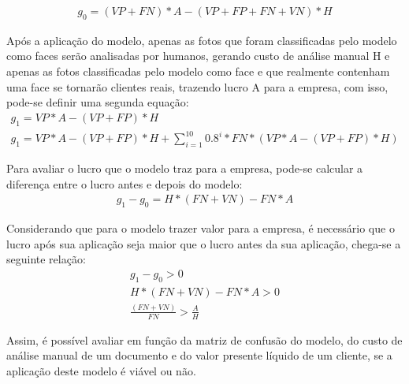 \begin{align} \label{eq:g_0}
    g_0 = (VP+FN)*A - (VP+FP+FN+VN)*H
\end{align}

Após a aplicação do modelo, apenas as fotos que foram classificadas pelo modelo como faces serão analisadas por humanos, gerando custo de análise manual H e apenas as fotos classificadas pelo modelo como face e que realmente contenham uma face se tornarão clientes reais, trazendo lucro A para a empresa, com isso, pode-se definir uma segunda equação:
\begin{align} \label{eq:g_1}
    g_1 = VP*A - (VP+FP)*H \\
    g_1 = VP*A - (VP+FP)*H + \sum\nolimits_{i = 1}^{10} 0.8^i * FN * (VP*A - (VP+FP)*H)
\end{align}

Para avaliar o lucro que o modelo traz para a empresa, pode-se calcular a diferença entre o lucro antes e depois do modelo:
\begin{align} \label{eq:profit}
    g_1 - g_0 = H*(FN+VN) - FN*A
\end{align}

Considerando que para o modelo trazer valor para a empresa, é necessário que o lucro após sua aplicação seja maior que o lucro antes da sua aplicação, chega-se a seguinte relação:
\begin{align} \label{eq:profit2}
    g_1 - g_0 > 0 \\
    H*(FN+VN) - FN*A > 0 \\
    \frac{(FN + VN)}{FN} > \frac{A}{H}
\end{align}

Assim, é possível avaliar em função da matriz de confusão do modelo, do custo de análise manual de um documento e do valor presente líquido de um cliente, se a aplicação deste modelo é viável ou não.
